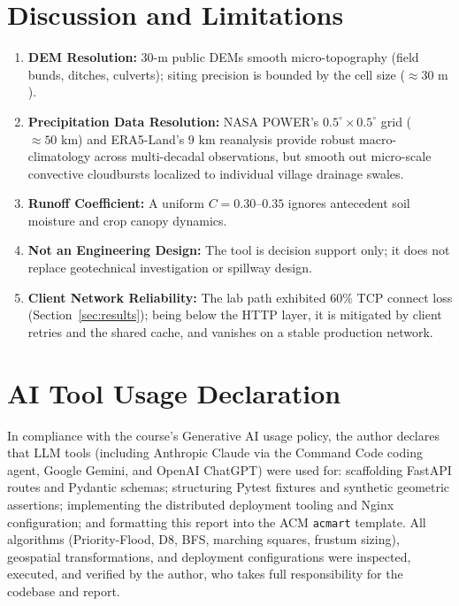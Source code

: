 \documentclass[manuscript,screen,review]{acmart}
\begin{document}
\section{Discussion and Limitations}
\label{sec:discussion}
\begin{enumerate}
    \item \textbf{DEM Resolution:} 30-m public DEMs smooth micro-topography (field bunds, ditches, culverts); siting precision is bounded by the cell size ($\approx 30\text{ m}$).
    \item \textbf{Precipitation Data Resolution:} NASA POWER's $0.5^\circ \times 0.5^\circ$ grid ($\approx 50\text{ km}$) and ERA5-Land's $9\text{ km}$ reanalysis provide robust macro-climatology across multi-decadal observations, but smooth out micro-scale convective cloudbursts localized to individual village drainage swales.
    \item \textbf{Runoff Coefficient:} A uniform $C = 0.30$--$0.35$ ignores antecedent soil moisture and crop canopy dynamics.
    \item \textbf{Not an Engineering Design:} The tool is decision support only; it does not replace geotechnical investigation or spillway design.
    \item \textbf{Client Network Reliability:} The lab path exhibited $60\%$ TCP connect loss (Section~\ref{sec:results}); being below the HTTP layer, it is mitigated by client retries and the shared cache, and vanishes on a stable production network.
\end{enumerate}

\section{AI Tool Usage Declaration}
\label{sec:ai-usage}
In compliance with the course's Generative AI usage policy, the author declares that LLM tools (including Anthropic Claude via the Command Code coding agent, Google Gemini, and OpenAI ChatGPT) were used for: scaffolding FastAPI routes and Pydantic schemas; structuring Pytest fixtures and synthetic geometric assertions; implementing the distributed deployment tooling and Nginx configuration; and formatting this report into the ACM \texttt{acmart} template. All algorithms (Priority-Flood, D8, BFS, marching squares, frustum sizing), geospatial transformations, and deployment configurations were inspected, executed, and verified by the author, who takes full responsibility for the codebase and report.
\end{document}
